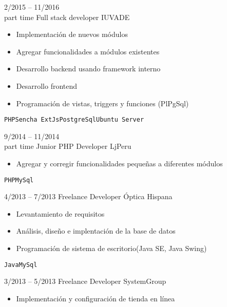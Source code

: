 \begin{entrylist}
{        }
	\entry
		{2/2015 -- 11/2016\\\footnotesize{part time}}
		{Full stack developer}
		{IUVADE}
		{
		    \vspace{-5mm}
    	    \begin{itemize}
    	        \setlength\itemsep{0pt}
    	        \setlength\parskip{0pt}
    	        \item Implementación de nuevos módulos
    	        \item Agregar funcionalidades a módulos existentes
    	        \item Desarrollo backend usando framework interno
    	        \item Desarrollo frontend
    	        \item Programación de vistas, triggers y funciones (PlPgSql)
    	    \end{itemize}
		    \texttt{PHP}\slashsep\texttt{Sencha ExtJs}\slashsep\texttt{PostgreSql}\slashsep\texttt{Ubuntu Server}
        }
	\entry
		{9/2014 -- 11/2014\\\footnotesize{part time}}
		{Junior PHP Developer}
		{LjPeru}
		{
		    \vspace{-5mm}
    	    \begin{itemize}
    	        \setlength\itemsep{0pt}
    	        \setlength\parskip{0pt}
    	        \item Agregar y corregir funcionalidades pequeñas a diferentes módulos
    	    \end{itemize}
		    \texttt{PHP}\slashsep\texttt{MySql}
        }
	\entry
		{4/2013 -- 7/2013}
		{Freelance Developer}
		{Óptica Hispana}
		{
		    \vspace{-5mm}
    	    \begin{itemize}
    	        \setlength\itemsep{0pt}
    	        \setlength\parskip{0pt}
    	        \item Levantamiento de requisitos
    	        \item Análisis, diseño e implentación de la base de datos
    	        \item Programación de sistema de escritorio(Java SE, Java Swing)
    	    \end{itemize}
		    \texttt{Java}\slashsep\texttt{MySql}
        }
	\entry
		{3/2013 -- 5/2013}
		{Freelance Developer}
		{SystemGroup}
		{
		    \vspace{-5mm}
		    \begin{itemize}
		        \setlength\itemsep{0pt}
    	        \setlength\parskip{0pt}
		        \item Implementación y configuración de tienda en línea

\end{itemize}}
\end{entrylist}
